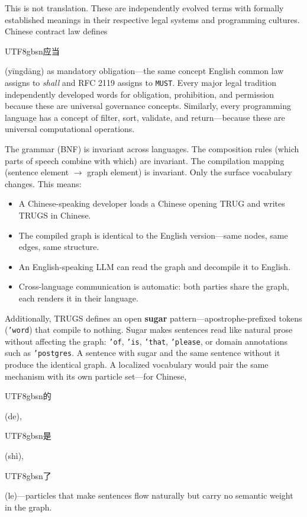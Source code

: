 \documentclass{article}
\begin{document}
This is not translation. These are independently evolved terms with formally established meanings in their respective legal systems and programming cultures. Chinese contract law defines \begin{CJK}{UTF8}{gbsn}应当\end{CJK} (y\=ingd\=ang) as mandatory obligation---the same concept English common law assigns to \textit{shall} and RFC 2119 assigns to \texttt{MUST}. Every major legal tradition independently developed words for obligation, prohibition, and permission because these are universal governance concepts. Similarly, every programming language has a concept of filter, sort, validate, and return---because these are universal computational operations.

The grammar (BNF) is invariant across languages. The composition rules (which parts of speech combine with which) are invariant. The compilation mapping (sentence element $\to$ graph element) is invariant. Only the surface vocabulary changes. This means:

\begin{itemize}
    \item A Chinese-speaking developer loads a Chinese opening TRUG and writes TRUGS in Chinese.
    \item The compiled graph is identical to the English version---same nodes, same edges, same structure.
    \item An English-speaking LLM can read the graph and decompile it to English.
    \item Cross-language communication is automatic: both parties share the graph, each renders it in their language.
\end{itemize}

Additionally, TRUGS defines an open \textbf{sugar} pattern---apostrophe-prefixed tokens (\texttt{'word}) that compile to nothing. Sugar makes sentences read like natural prose without affecting the graph: \texttt{'of}, \texttt{'is}, \texttt{'that}, \texttt{'please}, or domain annotations such as \texttt{'postgres}. A sentence with sugar and the same sentence without it produce the identical graph. A localized vocabulary would pair the same mechanism with its own particle set---for Chinese, \begin{CJK}{UTF8}{gbsn}的\end{CJK} (de), \begin{CJK}{UTF8}{gbsn}是\end{CJK} (sh\`i), \begin{CJK}{UTF8}{gbsn}了\end{CJK} (le)---particles that make sentences flow naturally but carry no semantic weight in the graph.
\end{document}

